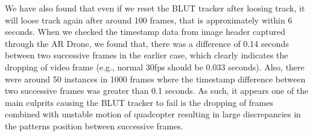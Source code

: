 \documentclass[runningheads]{llncs}
\begin{document}
We have also found that even if we reset the BLUT tracker after loosing track,
it will loose track again after around 100 frames, that is approximately within
6 seconds. When we checked the timestamp data from image header captured through
the AR Drone, we found that, there was a difference of 0.14 seconds between two
successive frames in the earlier case, which clearly indicates the dropping of
video frame (e.g., normal 30fps should be 0.033 seconds). Also, there were around 50
instances in 1000 frames where the timestamp difference between two successive
frames was greater than 0.1 seconds. As such, it appears one of the main
culprits causing the BLUT tracker to fail is the dropping of frames combined
with unstable motion of quadcopter resulting in large discrepancies in the
patterns position between successive frames.
\end{document}
